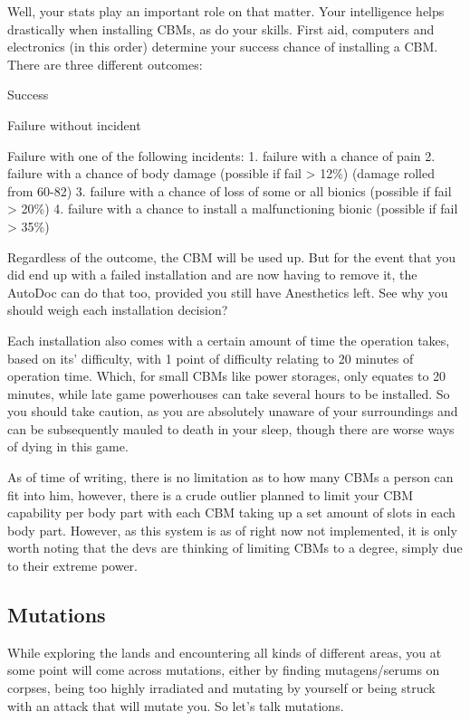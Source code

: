 Well, your stats play an important role on that matter. Your intelligence helps drastically when installing CBMs, as do your skills. First aid, computers and electronics (in this order) determine your success chance of installing a CBM. There are three different outcomes:

Success

Failure without incident

Failure with one of the following incidents:
    1. failure with a chance of pain
    2. failure with a chance of body damage (possible if fail > 12\%) (damage rolled from 60-82)
    3. failure with a chance of loss of some or all bionics (possible if fail > 20\%)
    4. failure with a chance to install a malfunctioning bionic (possible if fail > 35\%)
    
Regardless of the outcome, the CBM will be used up. But for the event that you did end up with a failed installation and are now having to remove it, the AutoDoc can do that too, provided you still have Anesthetics left. See why you should weigh each installation decision?

Each installation also comes with a certain amount of time the operation takes, based on its' difficulty, with 1 point of difficulty relating to 20 minutes of operation time. Which, for small CBMs like power storages, only equates to 20 minutes, while late game powerhouses can take several hours to be installed. So you should take caution, as you are absolutely unaware of your surroundings and can be subsequently mauled to death in your sleep, though there are worse ways of dying in this game.

As of time of writing, there is no limitation as to how many CBMs a person can fit into him, however, there is a crude outlier planned to limit your CBM capability per body part with each CBM taking up a set amount of slots in each body part. However, as this system is as of right now not implemented, it is only worth noting that the devs are thinking of limiting CBMs to a degree, simply due to their extreme power.

\subsection{Mutations}

While exploring the lands and encountering all kinds of different areas, you at some point will come across mutations, either by finding mutagens/serums on corpses, being too highly irradiated and mutating by yourself or being struck with an attack that will mutate you. So let's talk mutations.

